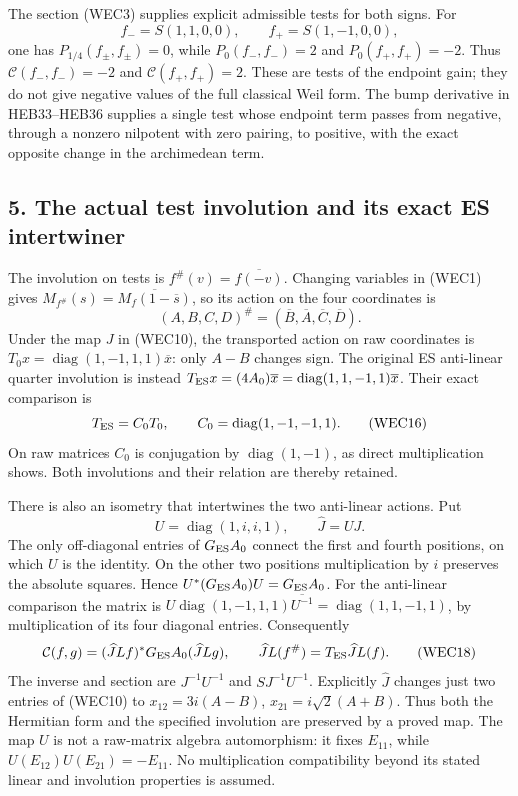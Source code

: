 \documentclass[
  10pt,
  a4paper,
]{article}
\begin{document}
The section (WEC3) supplies explicit admissible tests for both signs.
For \[
f_-=S(1,1,0,0),\qquad f_+=S(1,-1,0,0),
\tag{WEC14}
\] one has \(P_{1/4}(f_\pm,f_\pm)=0\), while \(P_0(f_-,f_-)=2\) and
\(P_0(f_+,f_+)=-2\). Thus \(\mathcal C(f_-,f_-)=-2\) and
\(\mathcal C(f_+,f_+)=2\). These are tests of the endpoint gain; they do
not give negative values of the full classical Weil form. The bump
derivative in HEB33--HEB36 supplies a single test whose endpoint term
passes from negative, through a nonzero nilpotent with zero pairing, to
positive, with the exact opposite change in the archimedean term.

\subsection{5. The actual test involution and its exact ES
intertwiner}\label{the-actual-test-involution-and-its-exact-es-intertwiner}

The involution on tests is \(f^\#(v)=\overline{f(-v)}\). Changing
variables in (WEC1) gives \(M_{f^\#}(s)=\overline{M_f(1-\overline s)}\),
so its action on the four coordinates is \[
(A,B,C,D)^\#=(\overline B,\overline A,\overline C,\overline D).
\tag{WEC15}
\] Under the map \(J\) in (WEC10), the transported action on raw
coordinates is \(T_0x=\operatorname{diag}(1,-1,1,1)\overline x\): only
\(A-B\) changes sign. The original ES anti-linear quarter involution is
instead
\(T_{\rm ES}x=(4A_0)\overline x=\operatorname{diag}(1,1,-1,1)\overline x\).
Their exact comparison is \[
T_{\rm ES}=C_0T_0,\qquad C_0=\operatorname{diag}(1,-1,-1,1).
\tag{WEC16}
\] On raw matrices \(C_0\) is conjugation by
\(\operatorname{diag}(1,-1)\), as direct multiplication shows. Both
involutions and their relation are thereby retained.

There is also an isometry that intertwines the two anti-linear actions.
Put \[
U=\operatorname{diag}(1,i,i,1),\qquad\widehat J=UJ.
\tag{WEC17}
\] The only off-diagonal entries of \(G_{\rm ES}A_0\) connect the first
and fourth positions, on which \(U\) is the identity. On the other two
positions multiplication by \(i\) preserves the absolute squares. Hence
\(U^*(G_{\rm ES}A_0)U=G_{\rm ES}A_0\). For the anti-linear comparison
the matrix is
\(U\operatorname{diag}(1,-1,1,1)\overline{U^{-1}}=\operatorname{diag}(1,1,-1,1)\),
by multiplication of its four diagonal entries. Consequently \[
\mathcal C(f,g)=(\widehat JLf)^*G_{\rm ES}A_0(\widehat JLg),
\qquad \widehat JL(f^\#)=T_{\rm ES}\widehat JL(f).
\tag{WEC18}
\] The inverse and section are \(J^{-1}U^{-1}\) and \(SJ^{-1}U^{-1}\).
Explicitly \(\widehat J\) changes just two entries of (WEC10) to
\(x_{12}=3i(A-B)\), \(x_{21}=i\sqrt2(A+B)\). Thus both the Hermitian
form and the specified involution are preserved by a proved map. The map
\(U\) is not a raw-matrix algebra automorphism: it fixes \(E_{11}\),
while \(U(E_{12})U(E_{21})=-E_{11}\). No multiplication compatibility
beyond its stated linear and involution properties is assumed.
\end{document}
